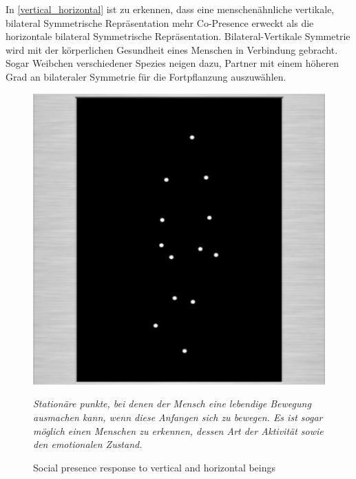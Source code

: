 \documentclass[a4paper,11pt]{article}%
\renewcommand{\\}{\vspace*{0.5\baselineskip} \newline}
\begin{document}
In \autoref{vertical_horizontal} ist zu erkennen, dass eine menschenähnliche vertikale, bilateral Symmetrische Repräsentation mehr \dq{}Co-Presence\dq{} erweckt als die horizontale bilateral Symmetrische Repräsentation. \citep[p.546-551]{thornhill1998relative}
Bilateral-Vertikale Symmetrie wird mit der körperlichen Gesundheit eines Menschen in Verbindung gebracht. Sogar Weibchen verschiedener Spezies neigen dazu, Partner mit einem höheren Grad an bilateraler Symmetrie für die Fortpflanzung auszuwählen. \citep[p. 659–669]{rhodes1998facial} \citep{biocca2002defining} \citep[p.233–242]{grammer1994human} \\
\begin{figure}[b!]
		\begin{footnotesize}
		\centering
			\includegraphics[scale= 0.5]{Abbildungen/moving_dots.JPG}
			\caption[Abbildung 1]{Social presence response to vertical and
horizontal beings}
			\textit{Stationäre punkte, bei denen der Mensch eine lebendige Bewegung ausmachen kann, wenn diese Anfangen sich zu bewegen. Es ist sogar möglich einen Menschen zu erkennen, dessen Art der Aktivität sowie den emotionalen Zustand. \citep{biocca2002defining} \citep[p.76-89]{johansson1975visual}}

			\label{moving_dots}
		\end{footnotesize}
	\end{figure}
\end{document}
